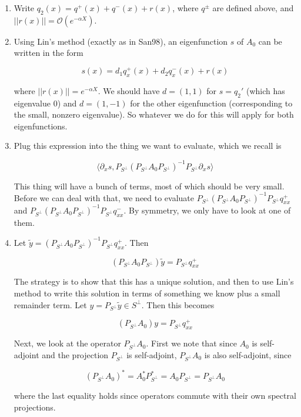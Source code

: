 \documentclass[12pt]{article}
\begin{document}
\begin{enumerate}

\item Write $q_2(x) = q^+(x) + q^-(x) + r(x)$, where $q^\pm$ are defined above, and $||r(x)|| = \mathcal{O}(e^{-\alpha X})$.

\item Using Lin's method (exactly as in San98), an eigenfunction $s$ of $A_0$ can be written in the form

\[
s(x) = d_1 q^+_x(x) + d_2 q^-_x(x) + r(x)
\]

where $||r(x)|| = e^{-\alpha X}$. We should have $d = (1, 1)$ for $s = q_2'$ (which has eigenvalue 0) and $d = (1, -1)$ for the other eigenfunction (corresponding to the small, nonzero eigenvalue). So whatever we do for this will apply for both eigenfunctions.

\item Plug this expression into the thing we want to evaluate, which we recall is

\[
\langle \partial_x s, P_{S^\perp} (P_{S^\perp} A_0 P_{S^\perp})^{-1} P_{S^\perp} \partial_x s \rangle
\]

This thing will have a bunch of terms, most of which should be very small. Before we can deal with that, we need to evaluate $P_{S^\perp} (P_{S^\perp} A_0 P_{S^\perp})^{-1} P_{S^\perp} q^+_{xx}$ and $P_{S^\perp} (P_{S^\perp} A_0 P_{S^\perp})^{-1} P_{S^\perp} q^-_{xx}$. By symmetry, we only have to look at one of them.

\item Let $\tilde{y} = (P_{S^\perp} A_0 P_{S^\perp})^{-1} P_{S^\perp} q^+_{xx}$. Then 

\[
(P_{S^\perp} A_0 P_{S^\perp}) \tilde{y} = P_{S^\perp} q^+_{xx}
\]

The strategy is to show that this has a unique solution, and then to use Lin's method to write this solution in terms of something we know plus a small remainder term. Let $y = P_{S^\perp} \tilde{y} \in S^\perp$. Then this becomes

\[
(P_{S^\perp} A_0) y = P_{S^\perp} q^+_{xx}
\]

Next, we look at the operator $P_{S^\perp} A_0$. First we note that since $A_0$ is self-adjoint and the projection $P_{S^\perp}$ is self-adjoint, $P_{S^\perp} A_0$ is also self-adjoint, since

\[
(P_{S^\perp} A_0)^* = A_0^* P_{S^\perp}^* = A_0 P_{S^\perp} = P_{S^\perp} A_0
\]

where the last equality holds since operators commute with their own spectral projections.\\


\end{enumerate}
\end{document}
